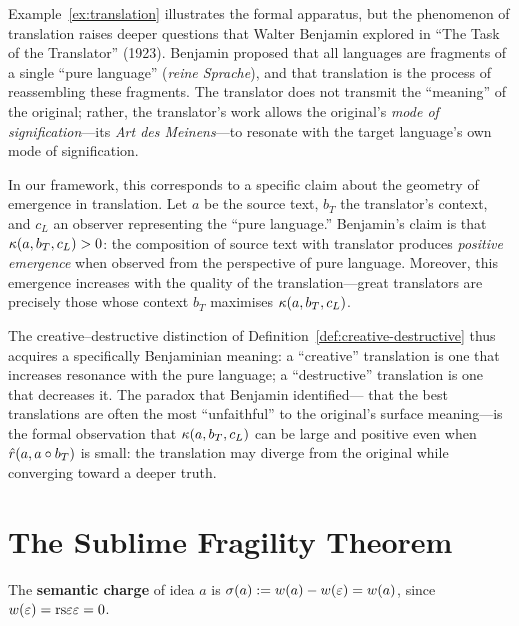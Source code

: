\begin{interpretation}
\label{interp:ch9:benjamin_pure_language}
Example~\ref{ex:translation} illustrates the formal apparatus, but the
phenomenon of translation raises deeper questions that Walter Benjamin
explored in ``The Task of the Translator'' (1923).  Benjamin proposed that
all languages are fragments of a single ``pure language'' (\emph{reine
Sprache}), and that translation is the process of reassembling these
fragments.  The translator does not transmit the ``meaning'' of the original;
rather, the translator's work allows the original's \emph{mode of
signification}---its \emph{Art des Meinens}---to resonate with the target
language's own mode of signification.

In our framework, this corresponds to a specific claim about the geometry
of emergence in translation.  Let $a$ be the source text, $b_T$ the
translator's context, and $c_L$ an observer representing the ``pure
language.''  Benjamin's claim is that $\kappa(a, b_T, c_L) > 0$: the
composition of source text with translator produces \emph{positive
emergence} when observed from the perspective of pure language.  Moreover,
this emergence increases with the quality of the translation---great
translators are precisely those whose context $b_T$ maximises
$\kappa(a, b_T, c_L)$.

The creative--destructive distinction of Definition~\ref{def:creative-destructive}
thus acquires a specifically Benjaminian meaning: a ``creative'' translation
is one that increases resonance with the pure language; a ``destructive''
translation is one that decreases it.  The paradox that Benjamin identified---
that the best translations are often the most ``unfaithful'' to the
original's surface meaning---is the formal observation that
$\kappa(a, b_T, c_L)$ can be large and positive even when
$\hat{r}(a, a \circ b_T)$ is small: the translation may diverge from the
original while converging toward a deeper truth.
\end{interpretation}



\section{The Sublime Fragility Theorem}

\begin{definition}
\label{def:semantic-charge}
The \textbf{semantic charge} of idea $a$ is $\sigma(a) := w(a) - w(\varepsilon) = w(a)$,
since $w(\varepsilon) = \mathrm{rs}{\varepsilon}{\varepsilon} = 0$.
\end{definition}

